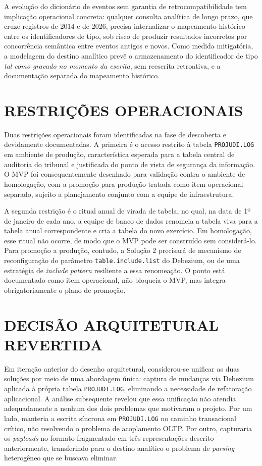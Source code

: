 \documentclass[12pt,letterpaper,oneside]{report}
\begin{document}
A evolução do dicionário de eventos sem garantia de retrocompatibilidade tem implicação operacional concreta: qualquer consulta analítica de longo prazo, que cruze registros de 2014 e de 2026, precisa internalizar o mapeamento histórico entre os identificadores de tipo, sob risco de produzir resultados incorretos por concorrência semântica entre eventos antigos e novos. Como medida mitigatória, a modelagem do destino analítico prevê o armazenamento do identificador de tipo \textit{tal como gravado no momento da escrita}, sem reescrita retroativa, e a documentação separada do mapeamento histórico.

\section{RESTRIÇÕES OPERACIONAIS}

Duas restrições operacionais foram identificadas na fase de descoberta e devidamente documentadas. A primeira é o acesso restrito à tabela \texttt{PROJUDI.LOG} em ambiente de produção, característica esperada para a tabela central de auditoria do tribunal e justificada do ponto de vista de segurança da informação. O MVP foi consequentemente desenhado para validação contra o ambiente de homologação, com a promoção para produção tratada como item operacional separado, sujeito a planejamento conjunto com a equipe de infraestrutura.

A segunda restrição é o ritual anual de virada de tabela, no qual, na data de 1º de janeiro de cada ano, a equipe de banco de dados renomeia a tabela viva para a tabela anual correspondente e cria a tabela do novo exercício. Em homologação, esse ritual não ocorre, de modo que o MVP pode ser construído sem considerá-lo. Para promoção a produção, contudo, a Solução 2 precisará de mecanismo de reconfiguração do parâmetro \texttt{table.include.list} do Debezium, ou de uma estratégia de \textit{include pattern} resiliente a essa renomeação. O ponto está documentado como item operacional, não bloqueia o MVP, mas integra obrigatoriamente o plano de promoção.

\section{DECISÃO ARQUITETURAL REVERTIDA}

Em iteração anterior do desenho arquitetural, considerou-se unificar as duas soluções por meio de uma abordagem única: captura de mudanças via Debezium aplicada à própria tabela \texttt{PROJUDI.LOG}, eliminando a necessidade de refatoração aplicacional. A análise subsequente revelou que essa unificação não atendia adequadamente a nenhum dos dois problemas que motivaram o projeto. Por um lado, manteria a escrita síncrona em \texttt{PROJUDI.LOG} no caminho transacional crítico, não resolvendo o problema de acoplamento OLTP. Por outro, capturaria os \textit{payloads} no formato fragmentado em três representações descrito anteriormente, transferindo para o destino analítico o problema de \textit{parsing} heterogêneo que se buscava eliminar.
\end{document}
